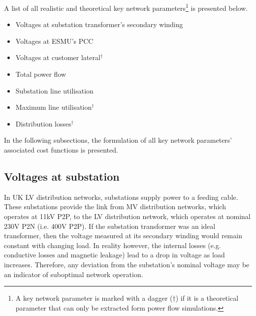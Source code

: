A list of all realistic and theoretical key network parameters\footnote[1]{A key network parameter is marked with a dagger ($\dagger$) if it is a theoretical parameter that can only be extracted form power flow simulations.} is presented below.

\begin{itemize}
	\item Voltages at substation transformer's secondary winding
	\item Voltages at ESMU's PCC
	\item Voltages at customer lateral$^{\dagger}$
	\item Total power flow
	\item Substation line utilisation
	\item Maximum line utilisation$^{\dagger}$
	\item Distribution losses$^{\dagger}$
\end{itemize}

In the following subsections, the formulation of all key network parameters' associated cost functions is presented.

\subsection{Voltages at substation}
\label{ch1:subsec:voltages-at-substation}


In UK LV distribution networks, substations supply power to a feeding cable.
These substations provide the link from MV distribution networks, which operates at 11kV P2P, to the LV distribution network, which operates at nominal 230V P2N (i.e. 400V P2P).
If the substation transformer was an ideal transformer, then the voltage measured at its secondary winding would remain constant with changing load.
In reality however, the internal losses (e.g. conductive losses and magnetic leakage) lead to a drop in voltage as load increases.
Therefore, any deviation from the substation's nominal voltage may be an indicator of suboptimal network operation.

